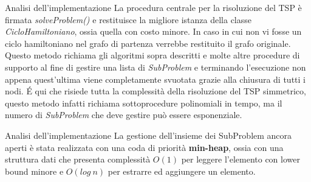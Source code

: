 \documentclass[10pt]{beamer}
\begin{document}
\begin{frame}{Analisi dell'implementazione}
    La procedura centrale per la risoluzione del TSP è firmata \textit{solveProblem()} e restituisce la migliore istanza della classe \textit{CicloHamiltoniano}, ossia quella con costo minore. In caso in cui non vi fosse un ciclo hamiltoniano nel grafo di partenza verrebbe restituito il grafo originale. Questo metodo richiama gli algoritmi sopra descritti e molte altre procedure di supporto al fine di gestire una lista di \textit{SubProblem} e terminando l'esecuzione non appena quest'ultima viene completamente svuotata grazie alla chiusura di tutti i nodi. \'E qui che risiede tutta la complessità della risoluzione del TSP simmetrico, questo metodo infatti richiama sottoprocedure polinomiali in tempo, ma il numero di \textit{SubProblem} che deve gestire può essere esponenziale.
\end{frame}

\begin{frame}{Analisi dell'implementazione}
    La gestione dell'insieme dei SubProblem ancora aperti è stata realizzata con una coda di priorità \textbf{min-heap}, ossia con una struttura dati che presenta complessità $O(1)$ per leggere l'elemento con lower bound minore e $O(log\:n)$ per estrarre ed aggiungere un elemento.
\end{frame}
\end{document}
